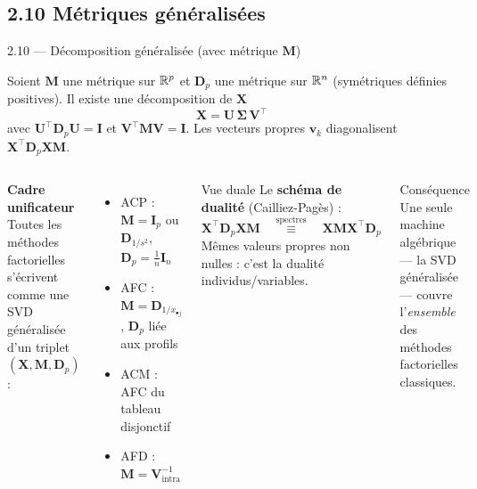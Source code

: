 \subsection{2.10 Métriques généralisées}
\begin{frame}{2.10 — Décomposition généralisée (avec métrique $\mathbf{M}$)}
\begin{theorem}
Soient $\mathbf{M}$ une métrique sur $\mathbb{R}^p$ et $\mathbf{D}_p$ une métrique sur $\mathbb{R}^n$
(symétriques définies positives). Il existe une décomposition de $\mathbf{X}$
\[
\mathbf{X} = \mathbf{U}\, \mathbf{\Sigma}\, \mathbf{V}^\top
\]
avec $\mathbf{U}^\top \mathbf{D}_p \mathbf{U} = \mathbf{I}$ et $\mathbf{V}^\top \mathbf{M} \mathbf{V} = \mathbf{I}$.
Les vecteurs propres $\mathbf{v}_k$ diagonalisent $\mathbf{X}^\top \mathbf{D}_p \mathbf{X} \mathbf{M}$.
\end{theorem}

\begin{columns}[T]
\textbf{Cadre unificateur}\\
\small Toutes les méthodes factorielles s'écrivent comme une SVD
généralisée d'un triplet $(\mathbf{X}, \mathbf{M}, \mathbf{D}_p)$ :

\begin{itemize}\small
  \item ACP : $\mathbf{M} = \mathbf{I}_p$ ou $\mathbf{D}_{1/s^2}$, $\mathbf{D}_p = \frac{1}{n}\mathbf{I}_n$
  \item AFC : $\mathbf{M} = \mathbf{D}_{1/x_{\bullet j}}$, $\mathbf{D}_p$ liée aux profils
  \item ACM : AFC du tableau disjonctif
  \item AFD : $\mathbf{M} = \mathbf{V}_{\text{intra}}^{-1}$
\end{itemize}
\begin{block}{Vue duale}
\small Le \textbf{schéma de dualité} (Cailliez-Pagès) :
\[
\mathbf{X}^\top \mathbf{D}_p \mathbf{X} \mathbf{M}
\quad \stackrel{\text{spectres}}{\equiv} \quad
\mathbf{X} \mathbf{M} \mathbf{X}^\top \mathbf{D}_p
\]
Mêmes valeurs propres non nulles : c'est la dualité individus/variables.
\end{block}

\begin{alertblock}{Conséquence}
\small Une seule machine algébrique --- la SVD généralisée --- couvre
l'\emph{ensemble} des méthodes factorielles classiques.
\end{alertblock}
\end{columns}
\end{frame}

